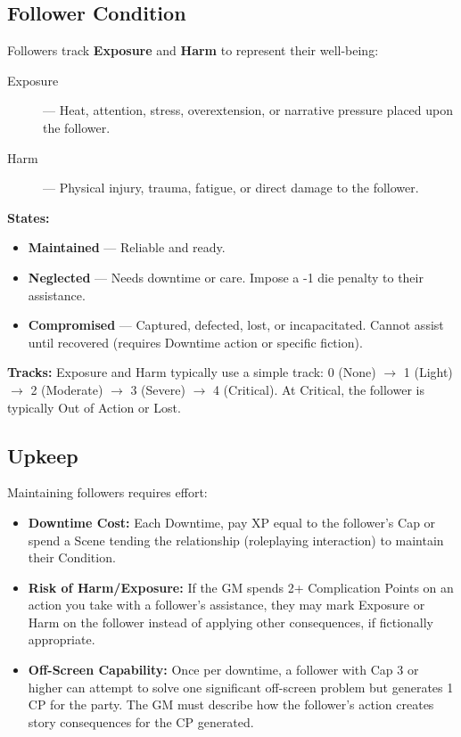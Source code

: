 \subsection*{Follower Condition}

Followers track \textbf{Exposure} and \textbf{Harm} to represent their well-being:

\begin{description}
  \item[Exposure]  — Heat, attention, stress, overextension, or narrative pressure placed upon the follower.
  \item[Harm]  — Physical injury, trauma, fatigue, or direct damage to the follower.
\end{description}

\textbf{States:}
\begin{itemize}
  \item \textbf{Maintained}  — Reliable and ready.
  \item \textbf{Neglected}  — Needs downtime or care. Impose a -1 die penalty to their assistance.
  \item \textbf{Compromised}  — Captured, defected, lost, or incapacitated. Cannot assist until recovered (requires Downtime action or specific fiction).
\end{itemize}

\textbf{Tracks:} Exposure and Harm typically use a simple track: 0 (None) $\rightarrow$ 1 (Light) $\rightarrow$ 2 (Moderate) $\rightarrow$ 3 (Severe) $\rightarrow$ 4 (Critical). At Critical, the follower is typically Out of Action or Lost.

\subsection*{Upkeep}

Maintaining followers requires effort:

\begin{itemize}
  \item \textbf{Downtime Cost:} Each Downtime, pay XP equal to the follower's Cap or spend a Scene tending the relationship (roleplaying interaction) to maintain their Condition.
  \item \textbf{Risk of Harm/Exposure:} If the GM spends 2+ Complication Points  on an action you take with a follower's assistance, they may mark Exposure or Harm on the follower instead of applying other consequences, if fictionally appropriate.
  \item \textbf{Off-Screen Capability:} Once per downtime, a follower with Cap 3 or higher can attempt to solve one significant off-screen problem but generates 1 CP for the party. The GM must describe how the follower's action creates story consequences for the CP generated.
\end{itemize}


